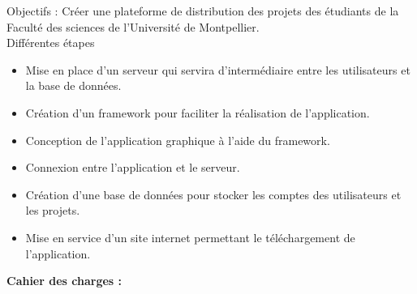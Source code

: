 \documentclass{report}
\begin{document}
Objectifs : Créer une plateforme de distribution des projets des étudiants de la Faculté des
sciences de l'Université de Montpellier.\\
Différentes étapes\\
\begin{itemize}
    \item Mise en place d’un serveur qui servira d’intermédiaire entre les utilisateurs et la
base de données.
    \item Création d’un framework pour faciliter la réalisation de l’application.
    \item Conception de l’application graphique à l’aide du framework.
    \item Connexion entre l’application et le serveur.
    \item Création d’une base de données pour stocker les comptes des utilisateurs et les
projets.
    \item Mise en service d’un site internet permettant le téléchargement de l’application. 
\end{itemize}
\vspace{0.5cm}
\large{\textbf{Cahier des charges :}}
\end{document}
